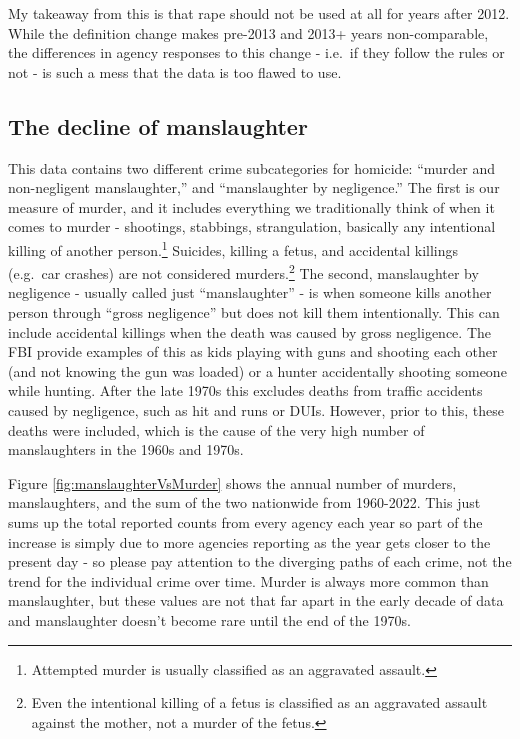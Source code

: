 \documentclass[
  12pt,
  openany]{book}
\begin{document}
My takeaway from this is that rape should not be used at all for years after 2012. While the definition change makes pre-2013 and 2013+ years non-comparable, the differences in agency responses to this change - i.e.~if they follow the rules or not - is such a mess that the data is too flawed to use.

\subsection{The decline of manslaughter}\label{the-decline-of-manslaughter}

This data contains two different crime subcategories for homicide: ``murder and non-negligent manslaughter,'' and ``manslaughter by negligence.'' The first is our measure of murder, and it includes everything we traditionally think of when it comes to murder - shootings, stabbings, strangulation, basically any intentional killing of another person.\footnote{Attempted murder is usually classified as an aggravated assault.} Suicides, killing a fetus, and accidental killings (e.g.~car crashes) are not considered murders.\footnote{Even the intentional killing of a fetus is classified as an aggravated assault against the mother, not a murder of the fetus.} The second, manslaughter by negligence - usually called just ``manslaughter'' - is when someone kills another person through ``gross negligence'' but does not kill them intentionally. This can include accidental killings when the death was caused by gross negligence. The FBI provide examples of this as kids playing with guns and shooting each other (and not knowing the gun was loaded) or a hunter accidentally shooting someone while hunting. After the late 1970s this excludes deaths from traffic accidents caused by negligence, such as hit and runs or DUIs. However, prior to this, these deaths were included, which is the cause of the very high number of manslaughters in the 1960s and 1970s.

Figure \ref{fig:manslaughterVsMurder} shows the annual number of murders, manslaughters, and the sum of the two nationwide from 1960-2022. This just sums up the total reported counts from every agency each year so part of the increase is simply due to more agencies reporting as the year gets closer to the present day - so please pay attention to the diverging paths of each crime, not the trend for the individual crime over time. Murder is always more common than manslaughter, but these values are not that far apart in the early decade of data and manslaughter doesn't become rare until the end of the 1970s.
\end{document}
